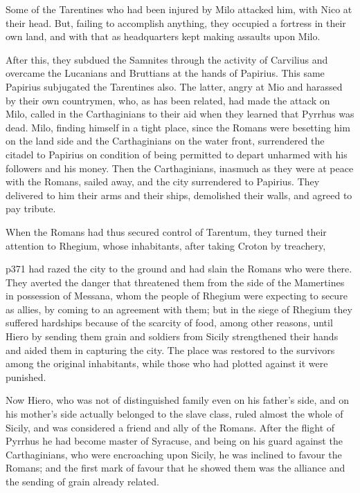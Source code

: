 Some of the Tarentines who had been injured by Milo attacked him, with Nico at their head. But, failing to accomplish anything, they occupied a fortress in their own land, and with that as headquarters kept making assaults upon Milo.

After this, they subdued the Samnites through the activity of Carvilius and overcame the Lucanians and Bruttians at the hands of Papirius. This same Papirius subjugated the Tarentines also. The latter, angry at Mio and harassed by their own countrymen, who, as has been related, had made the attack on Milo, called in the Carthaginians to their aid when they learned that Pyrrhus was dead. Milo, finding himself in a tight place, since the Romans were besetting him on the land side and the Carthaginians on the water front, surrendered the citadel to Papirius on condition of being permitted to depart unharmed with his followers and his money. Then the Carthaginians, inasmuch as they were at peace with the Romans, sailed away, and the city surrendered to Papirius. They delivered to him their arms and their ships, demolished their walls, and agreed to pay tribute.

When the Romans had thus secured control of Tarentum, they turned their attention to Rhegium, whose inhabitants, after taking Croton by treachery,

p371 had razed the city to the ground and had slain the Romans who were there. They averted the danger that threatened them from the side of the Mamertines in possession of Messana, whom the people of Rhegium were expecting to secure as allies, by coming to an agreement with them; but in the siege of Rhegium they suffered hardships because of the scarcity of food, among other reasons, until Hiero by sending them grain and soldiers from Sicily strengthened their hands and aided them in capturing the city. The place was restored to the survivors among the original inhabitants, while those who had plotted against it were punished.

Now Hiero, who was not of distinguished family even on his father's side, and on his mother's side actually belonged to the slave class, ruled almost the whole of Sicily, and was considered a friend and ally of the Romans. After the flight of Pyrrhus he had become master of Syracuse, and being on his guard against the Carthaginians, who were encroaching upon Sicily, he was inclined to favour the Romans; and the first mark of favour that he showed them was the alliance and the sending of grain already related.

